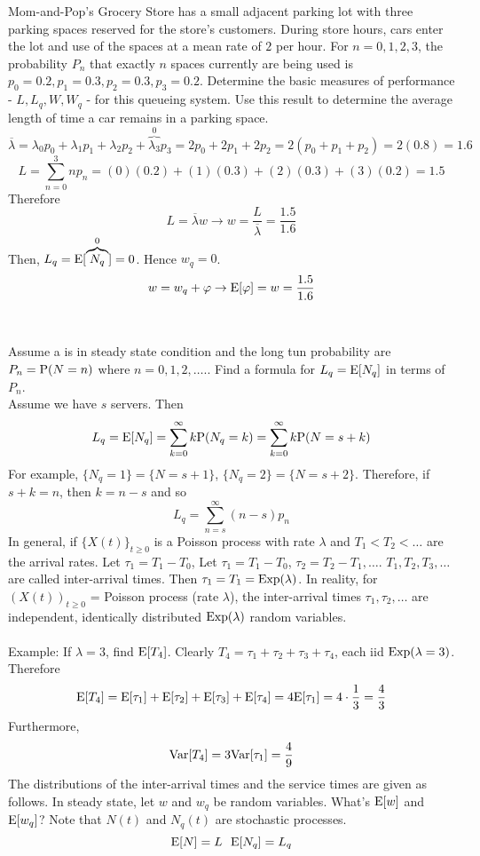 \documentclass[12pt]{article}
\begin{document}
Mom-and-Pop's Grocery Store has a small adjacent parking lot with three parking spaces reserved for the store's customers. During store hours, cars enter the lot and use of the spaces at a mean rate of $2$ per hour. For $n = 0,1,2,3$, the probability $P_n$ that exactly $n$ spaces currently are being used is $p_0 = 0.2, p_1 = 0.3, p_2 = 0.3,p_3 = 0.2$. Determine the basic measures of performance - $L, L_q, W, W_q$ - for this queueing system. Use this result to determine the average length of time a car remains in a parking space. \\ 
$$ \overline{\lambda} = \lambda_0p_0 + \lambda_1p_1 + \lambda_2p_2 + \overbrace{\lambda_3}^0p_3 = 2p_0 + 2p_1 + 2p_2 = 2(p_0 + p_1 + p_2) = 2(0.8) = 1.6$$ 
$$ L = \sum_{n=0}^3 np_n = (0)(0.2) + (1)(0.3) + (2)(0.3) + (3)(0.2) = 1.5 $$ 
Therefore $$ L = \overline{\lambda} w \to w = \frac{L}{\overline{\lambda}} = \frac{1.5}{1.6} $$ 
Then, $L_q = \mathrm{E}[ \overbrace{N_q}^0 ] = 0$. Hence $w_q = 0$. 
$$ w = w_q + \varphi \to \mathrm{E}[ \varphi ] = w = \frac{1.5}{1.6} $$ \\~\\
Assume a \qs is in steady state condition and the long tun probability are $P_n = \mathrm{P}( N = n )$ where $n = 0,1,2,\dots.$. Find a formula for $L_q = \mathrm{E}[ N_q ]$ in terms of $P_n$. \\
 Assume we have $s$ servers. Then $$L_q = \mathrm{E}[ N_q ] = \sum_{k=0}^\infty k\mathrm{P}( N_q = k ) = \sum_{k=0}^\infty k\mathrm{P}( N = s + k )$$ 
 For example, $\{N_q = 1\} = \{N = s + 1\}$, $\{N_q = 2\} = \{N = s + 2\}$. Therefore, if $s + k = n$, then $k = n-s$ and so $$ L_q = \sum_{n=s}^\infty (n-s)p_n $$ 
 In general, if $\{X(t)\}_{t \geq 0}$ is a Poisson process with rate $\lambda $ and $T_1 < T_2 < \dots$ are the arrival rates. Let $\tau_1 = T_1 - T_0$, Let $\tau_1 = T_1 - T_0$, $\tau_2 = T_2 - T_1, \dots$. $T_1,T_2,T_3,\dots$ are called inter-arrival times. Then $\tau_1 = T_1 = \text{Exp}( \lambda )$. In reality, for $(X(t))_{t \geq 0}$ = Poisson process (rate $\lambda$), the inter-arrival times $\tau_1,\tau_2,\dots$ are independent, identically distributed $\text{Exp}( \lambda )$ random variables. \\~\\
 Example: If $\lambda = 3$, find $\mathrm{E}[ T_4 ]$. Clearly $T_4 = \tau_1 + \tau_2 + \tau_3 + \tau_4$, each iid $\text{Exp}( \lambda = 3 )$. Therefore 
 $$\mathrm{E}[ T_4 ] = \mathrm{E}[ \tau_1 ] + \mathrm{E}[ \tau_2 ] + \mathrm{E}[ \tau_3 ] + \mathrm{E}[ \tau_4 ] = 4\mathrm{E}[ \tau_1 ] = 4 \cdot \frac{1}{3} = \frac{4}{3} $$ 
 Furthermore, $$ \mathrm{Var}[ T_4 ] = 3 \mathrm{Var}[ \tau_1 ] = \frac{4}{9} $$ 
 The distributions of the inter-arrival times and the service times are given as follows. In steady state, let $w$ and $w_q$ be random variables. What's $\mathrm{E}[ w ]$ and $\mathrm{E}[ w_q ]$? Note that $N(t)$ and $N_q(t)$ are stochastic processes. $$ \mathrm{E}[ N ] = L ~~ \mathrm{E}[ N_q ] = L_q$$ 
\end{document}
